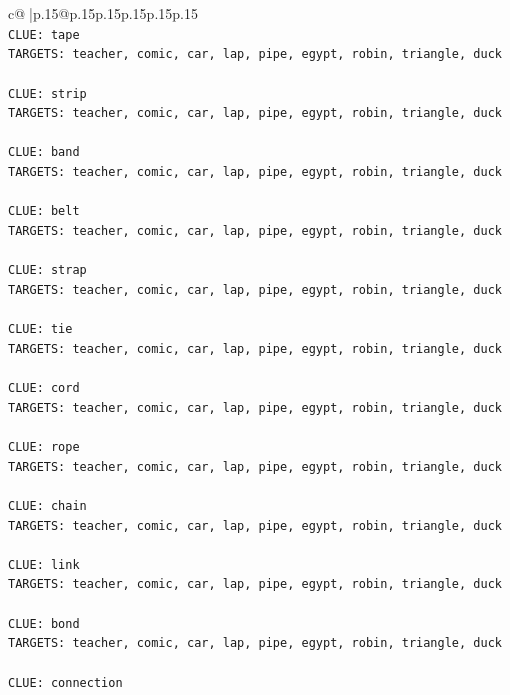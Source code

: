 \documentclass{article}
\begin{document}
{\begin{supertabular}{c@{$\;$}|p{.15\linewidth}@{}p{.15\linewidth}p{.15\linewidth}p{.15\linewidth}p{.15\linewidth}p{.15\linewidth}}
{{{\\ 
\texttt{CLUE: tape} \\
\texttt{TARGETS: teacher, comic, car, lap, pipe, egypt, robin, triangle, duck} \\
\\ 
\texttt{CLUE: strip} \\
\texttt{TARGETS: teacher, comic, car, lap, pipe, egypt, robin, triangle, duck} \\
\\ 
\texttt{CLUE: band} \\
\texttt{TARGETS: teacher, comic, car, lap, pipe, egypt, robin, triangle, duck} \\
\\ 
\texttt{CLUE: belt} \\
\texttt{TARGETS: teacher, comic, car, lap, pipe, egypt, robin, triangle, duck} \\
\\ 
\texttt{CLUE: strap} \\
\texttt{TARGETS: teacher, comic, car, lap, pipe, egypt, robin, triangle, duck} \\
\\ 
\texttt{CLUE: tie} \\
\texttt{TARGETS: teacher, comic, car, lap, pipe, egypt, robin, triangle, duck} \\
\\ 
\texttt{CLUE: cord} \\
\texttt{TARGETS: teacher, comic, car, lap, pipe, egypt, robin, triangle, duck} \\
\\ 
\texttt{CLUE: rope} \\
\texttt{TARGETS: teacher, comic, car, lap, pipe, egypt, robin, triangle, duck} \\
\\ 
\texttt{CLUE: chain} \\
\texttt{TARGETS: teacher, comic, car, lap, pipe, egypt, robin, triangle, duck} \\
\\ 
\texttt{CLUE: link} \\
\texttt{TARGETS: teacher, comic, car, lap, pipe, egypt, robin, triangle, duck} \\
\\ 
\texttt{CLUE: bond} \\
\texttt{TARGETS: teacher, comic, car, lap, pipe, egypt, robin, triangle, duck} \\
\\ 
\texttt{CLUE: connection} \\
}}}
\end{supertabular}}
\end{document}
